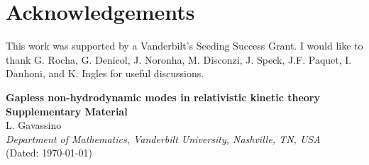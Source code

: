 \documentclass[a4paper, amsfonts, amssymb, amsmath, reprint, showkeys, nofootinbib, twoside, onecolumn,notitlepage,,longbibliography]{revtex4-2}
\theoremstyle{definition}
\theoremstyle{theorem}
\theoremstyle{corollary}
\begin{document}







\section*{Acknowledgements}

This work was supported by a Vanderbilt's Seeding Success Grant. I would like to thank G. Rocha, G. Denicol, J. Noronha, M. Disconzi, J. Speck, J.F. Paquet, I. Danhoni, and K. Ingles for useful discussions.  









\onecolumngrid
\newpage
\begin{center}
  \textbf{\large Gapless non-hydrodynamic modes in relativistic kinetic theory\\ Supplementary Material}\\[.2cm]
  L. Gavassino\\[.1cm]
  {\itshape Department of Mathematics, Vanderbilt University, Nashville, TN, USA\\}
(Dated: \today)\\[1cm]
\end{center}
\end{document}

